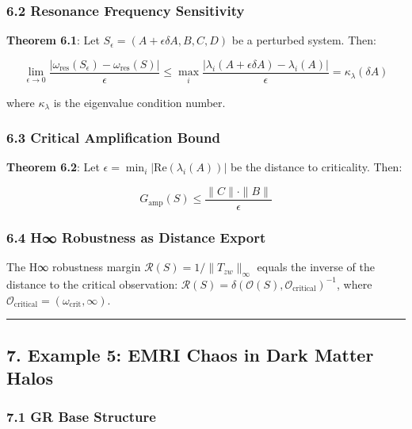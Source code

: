 \documentclass[
]{article}
\begin{document}
\subsubsection{6.2 Resonance Frequency
Sensitivity}\label{resonance-frequency-sensitivity}

\textbf{Theorem 6.1}: Let
\(S_\epsilon = (A + \epsilon \delta A, B, C, D)\) be a perturbed system.
Then:

\[\lim_{\epsilon \to 0} \frac{|\omega_{\text{res}}(S_\epsilon) - \omega_{\text{res}}(S)|}{\epsilon} \leq \max_i \frac{|\lambda_i(A + \epsilon \delta A) - \lambda_i(A)|}{\epsilon} = \kappa_\lambda(\delta A)\]

where \(\kappa_\lambda\) is the eigenvalue condition number.

\subsubsection{6.3 Critical Amplification
Bound}\label{critical-amplification-bound}

\textbf{Theorem 6.2}: Let
\(\epsilon = \min_i |\text{Re}(\lambda_i(A))|\) be the distance to
criticality. Then:

\[G_{\text{amp}}(S) \leq \frac{\|C\| \cdot \|B\|}{\epsilon}\]

\subsubsection{6.4 H∞ Robustness as Distance
Export}\label{h-robustness-as-distance-export}

The H∞ robustness margin \(\mathcal{R}(S) = 1/\|T_{zw}\|_\infty\) equals
the inverse of the distance to the critical observation:
\(\mathcal{R}(S) = \delta(\mathcal{O}(S), \mathcal{O}_{\text{critical}})^{-1}\),
where
\(\mathcal{O}_{\text{critical}} = (\omega_{\text{crit}}, \infty)\).

\begin{center}\rule{0.5\linewidth}{0.5pt}\end{center}

\subsection{7. Example 5: EMRI Chaos in Dark Matter
Halos}\label{example-5-emri-chaos-in-dark-matter-halos}

\subsubsection{7.1 GR Base Structure}\label{gr-base-structure}
\end{document}
